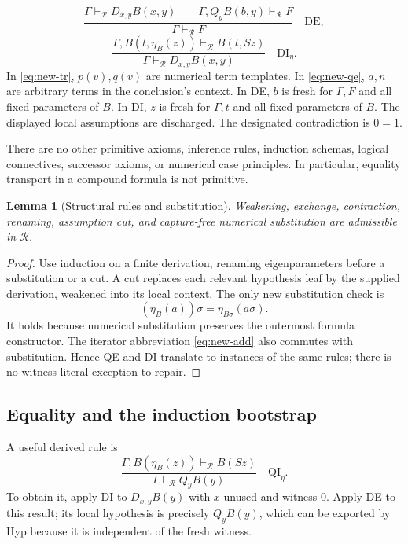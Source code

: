 \documentclass[11pt,a4paper]{article}
\newtheorem{lemma}[theorem]{Lemma}
\theoremstyle{definition}
\begin{document}
\begin{equation}
 \frac{\Gamma\vdash_{\mathcal R}D_{x,y}B(x,y)\qquad
       \Gamma,Q_yB(b,y)\vdash_{\mathcal R}F}
      {\Gamma\vdash_{\mathcal R}F}
 \quad\mathrm{DE},
 \label{eq:new-de}
\end{equation}
\begin{equation}
 \frac{\Gamma,B(t,\eta_B(z))\vdash_{\mathcal R}B(t,Sz)}
      {\Gamma\vdash_{\mathcal R}D_{x,y}B(x,y)}
 \quad\mathrm{DI}_{\eta}.
 \label{eq:new-di}
\end{equation}
In \eqref{eq:new-tr}, $p(v),q(v)$ are numerical term templates.  In
\eqref{eq:new-qe}, $a,n$ are arbitrary terms in the conclusion's context.
In DE, $b$ is fresh for $\Gamma,F$ and all fixed parameters of $B$.
In DI, $z$ is fresh for $\Gamma,t$ and all fixed parameters of $B$.
The displayed local assumptions are discharged.  The designated
contradiction is $0=1$.

There are no other primitive axioms, inference rules, induction schemas,
logical connectives, successor axioms, or numerical case principles.
In particular, equality transport in a compound formula is not primitive.

\begin{lemma}[Structural rules and substitution]
\label{lem:new-structural}
Weakening, exchange, contraction, renaming, assumption cut, and capture-free
numerical substitution are admissible in $\mathcal R$.
\end{lemma}
\begin{proof}
Use induction on a finite derivation, renaming eigenparameters before a
substitution or a cut.  A cut replaces each relevant hypothesis leaf by the
supplied derivation, weakened into its local context.  The only new
substitution check is
\[
 (\eta_B(a))\sigma=\eta_{B\sigma}(a\sigma).
\]
It holds because numerical substitution preserves the outermost formula
constructor.  The iterator abbreviation \eqref{eq:new-add} also commutes with
substitution.  Hence QE and DI translate to instances of the same rules;
there is no witness-literal exception to repair.
\end{proof}

\subsection{Equality and the induction bootstrap}
\label{subsec:new-bootstrap}

A useful derived rule is
\begin{equation}
 \frac{\Gamma,B(\eta_B(z))\vdash_{\mathcal R}B(Sz)}
      {\Gamma\vdash_{\mathcal R}Q_yB(y)}
 \quad\mathrm{QI}_{\eta}.
 \label{eq:new-qi}
\end{equation}
To obtain it, apply DI to $D_{x,y}B(y)$ with $x$ unused and witness $0$.
Apply DE to this result; its local hypothesis is precisely $Q_yB(y)$, which
can be exported by Hyp because it is independent of the fresh witness.
\end{document}
